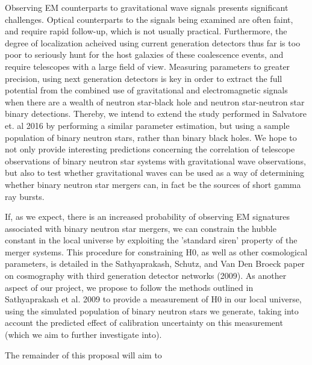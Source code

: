\documentclass{article}
\begin{document}
Observing EM counterparts to gravitational wave signals presents significant challenges.  Optical counterparts to the signals being examined are often faint, and require rapid follow-up, which is not usually practical.  Furthermore, the degree of localization acheived using current generation detectors thus far is too poor to seriously hunt for the host galaxies of these coalescence events, and require telescopes with a large field of view.  Measuring parameters to greater precision, using next generation detectors is key in order to extract the full potential from the combined use of gravitational and electromagnetic signals when there are a wealth of neutron star-black hole and neutron star-neutron star binary detections. Thereby, we intend to extend the study performed in Salvatore et. al 2016 by performing a similar parameter estimation, but using a sample population of binary neutron stars, rather than binary black holes.  We hope to not only provide interesting predictions concerning the correlation of telescope observations of binary neutron star systems with gravitational wave observations, but also to test whether gravitational waves can be used as a way of determining whether binary neutron star mergers can, in fact be the sources of short gamma ray bursts.

If, as we expect, there is an increased probability of observing EM signatures associated with binary neutron star mergers, we can constrain the hubble constant in the local universe by exploiting the 'standard siren' property of the merger systems.  This procedure for constraining H0, as well as other cosmological parameters, is detailed in the Sathyaprakash, Schutz, and Van Den Broeck paper on cosmography with third generation detector networks (2009).  As another aspect of our project, we propose to follow the methods outlined in Sathyaprakash et al. 2009 to provide a measurement of H0 in our local universe, using the simulated population of binary neutron stars we generate, taking into account the predicted effect of calibration uncertainty on this measurement (which we aim to further investigate into).

The remainder of this proposal will aim to 
\end{document}
